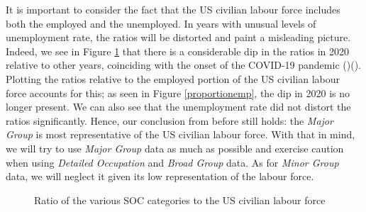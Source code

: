 \documentclass[11pt]{article}
\begin{document}
It is important to consider the fact that the US civilian labour force includes both the employed and the unemployed. In years with unusual levels of unemployment rate, the ratios will be distorted and paint a misleading picture. Indeed, we see in Figure \ref{proportion} that there is a considerable dip in the ratios in 2020 relative to other years, coinciding with the onset of the COVID-19 pandemic (\cite{covid2020unemployment})(\cite{congresscovidunemployment}). Plotting the ratios relative to the employed portion of the US civilian labour force accounts for this; as seen in Figure \ref{proportionemp}, the dip in 2020 is no longer present. We can also see that the unemployment rate did not distort the ratios significantly. Hence, our conclusion from before still holds: the \emph{Major Group} is most representative of the US civilian labour force. With that in mind, we will try to use \emph{Major Group} data as much as possible and exercise caution when using \emph{Detailed Occupation} and \emph{Broad Group} data. As for \emph{Minor Group} data, we will neglect it given its low representation of the labour force.



\begin{figure}[!htb]
	\centering
	  \hfill
	\hfill
	\hfill
	\hfill
	\caption{Ratio of the various SOC categories to the US civilian labour force}
	\label{proportion}
  \end{figure}
  
\end{document}
